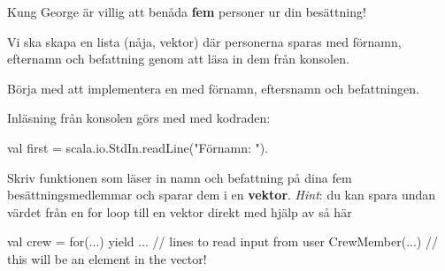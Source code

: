 %
%  	  
%  	
%  	
%  
%  
%
%
%
%

\Subtask Kung George {\"a}r villig att ben{\aa}da {\bf fem} personer ur din bes{\"a}ttning! 

Vi ska skapa en lista (nåja, vektor) d{\"a}r personerna sparas med f{\"o}rnamn, efternamn och befattning genom att l{\"a}sa in dem fr{\aa}n konsolen. 

Börja med att implementera en  med förnamn, eftersnamn och befattningen.

\Subtask Inl{\"a}sning från konsolen g{\"o}rs med  med kodraden: 
\begin{Code}
val first = scala.io.StdIn.readLine("Förnamn: "). 
\end{Code}

Skriv funktionen  som läser in namn och befattning på dina fem besättningsmedlemmar och sparar dem i en {\bf vektor}. \emph{Hint}: du kan spara undan värdet från en for loop till en vektor direkt med hjälp av  så här 
\begin{CodeSmall} 
val crew = for(...) yield { 
... // lines to read input from user
	CrewMember(...) // this will be an element in the vector!
}
\end{CodeSmall}


